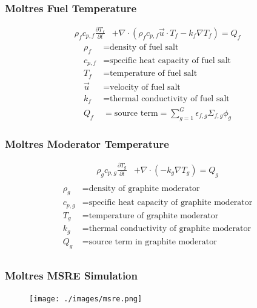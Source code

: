 \begin{frame}
        \frametitle{Moltres Fuel Temperature}
\begin{align}
        \rho_fc_{p,f}\frac{\partial T_f}{\partial t} &+ \nabla\cdot\left(\rho_f
        c_{p,f} \vec{u}\cdot T_f -k_f\nabla T_f\right) =  Q_f
\end{align}
\begin{align}
  \rho_f &= \mbox{density of fuel salt}\\
  c_{p,f} &= \mbox{specific heat capacity of fuel salt}\\
  T_f &= \mbox{temperature of fuel salt}\\
  \vec{u} &= \mbox{velocity of fuel salt}\\
  k_f &= \mbox{thermal conductivity of fuel salt}\\
  Q_f &= \mbox{source term} = \sum_{g=1}^G \epsilon_{f,g}\Sigma_{f,g}\phi_g
\end{align}
\end{frame}


\begin{frame}
        \frametitle{Moltres Moderator Temperature}
\begin{align}
        \rho_gc_{p,g}\frac{\partial T_g}{\partial t} &+
        \nabla\cdot\left(-k_g\nabla T_g\right) =  Q_g\\
\end{align}
\begin{align}
  \rho_g &= \mbox{density of graphite moderator}\\
  c_{p,g} &= \mbox{specific heat capacity of graphite moderator}\\
  T_g &= \mbox{temperature of graphite moderator}\\
  k_g &= \mbox{thermal conductivity of graphite moderator}\\
  Q_g &= \mbox{source term in graphite moderator}\\
\end{align}

\end{frame}


\begin{frame}
        \frametitle{Moltres MSRE Simulation}
  \begin{figure}
   \vspace{-0.05in}
   \texttt{[image: ./images/msre.png]}
    \end{figure}
\end{frame}



